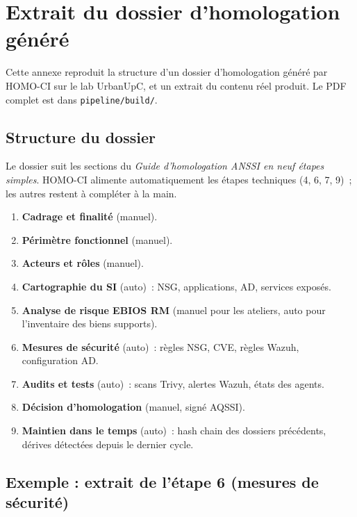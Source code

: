 \chapter{Extrait du dossier d'homologation généré}
\label{annexe:dossier}

Cette annexe reproduit la structure d'un dossier d'homologation
généré par HOMO-CI sur le lab UrbanUpC, et un extrait du contenu
réel produit. Le PDF complet est dans \texttt{pipeline/build/}.

\section{Structure du dossier}

Le dossier suit les sections du \emph{Guide d'homologation ANSSI
en neuf étapes simples}. HOMO-CI alimente automatiquement les
étapes techniques (4, 6, 7, 9)~; les autres restent à compléter
à la main.

\begin{enumerate}
  \item \textbf{Cadrage et finalité} (manuel).
  \item \textbf{Périmètre fonctionnel} (manuel).
  \item \textbf{Acteurs et rôles} (manuel).
  \item \textbf{Cartographie du SI} (auto)~: NSG, applications,
    AD, services exposés.
  \item \textbf{Analyse de risque EBIOS RM} (manuel pour les
    ateliers, auto pour l'inventaire des biens supports).
  \item \textbf{Mesures de sécurité} (auto)~: règles NSG, CVE,
    règles Wazuh, configuration AD.
  \item \textbf{Audits et tests} (auto)~: scans Trivy, alertes
    Wazuh, états des agents.
  \item \textbf{Décision d'homologation} (manuel, signé AQSSI).
  \item \textbf{Maintien dans le temps} (auto)~: hash chain des
    dossiers précédents, dérives détectées depuis le dernier
    cycle.
\end{enumerate}

\section{Exemple : extrait de l'étape 6 (mesures de sécurité)}

